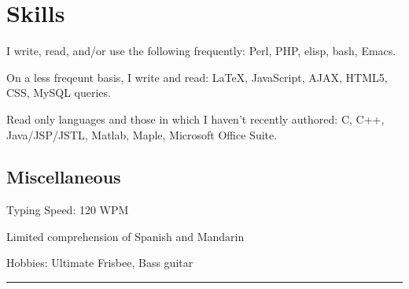 \documentclass[10pt]{article}
\begin{document}
%
\vspace{-.55cm}
\section{Skills}
\vspace{-0.25cm}
\item I write, read, and/or use the following frequently: Perl, PHP, elisp, bash, Emacs.
\item On a less freqeunt basis, I write and read: \LaTeX, JavaScript, AJAX, HTML5, CSS, MySQL queries.
\item Read only languages and those in which I haven't recently authored: C, C++, Java/JSP/JSTL, Matlab, Maple, Microsoft Office Suite.
\subsection{Miscellaneous}
\item Typing Speed: 120 WPM
\item Limited comprehension of Spanish and Mandarin
\item Hobbies: Ultimate Frisbee, Bass guitar
%
\vfill
\hrule
\end{document}
